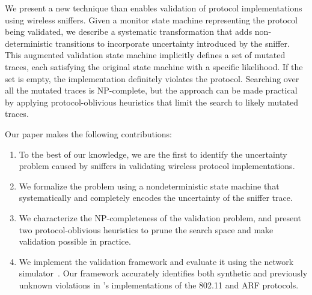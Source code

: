 We present a new technique than enables validation of protocol implementations using
wireless sniffers. Given a monitor state machine representing the protocol being
validated, we describe a systematic transformation that adds non-deterministic
transitions to incorporate uncertainty introduced by the sniffer. This
augmented validation state machine implicitly defines a set of
mutated traces, each satisfying the original state machine with a specific
likelihood. If the set is empty, the implementation definitely violates the
protocol. Searching over all the mutated traces is NP-complete, but the approach
can be made practical by applying protocol-oblivious heuristics that limit the
search to likely mutated traces.

Our paper makes the following contributions:
\begin{enumerate}
  \item To the best of our knowledge, we are the first to identify the
    uncertainty problem caused by sniffers in validating wireless protocol
    implementations.
  \item We formalize the problem using a nondeterministic state machine that
    systematically and completely encodes the uncertainty of the
    sniffer trace.
  \item We characterize the NP-completeness of the validation problem, and
    present two protocol-oblivious heuristics to prune the search space and make
    validation possible in practice.
  \item We implement the validation framework and evaluate it using the \ns{}
    network simulator~\cite{riley2010ns}. Our framework accurately identifies
    both synthetic and previously unknown violations in \ns{}'s implementations
    of the 802.11 and ARF protocols.
\end{enumerate}
